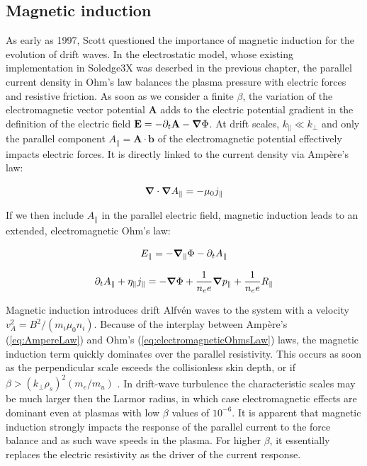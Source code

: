 \subsection{Magnetic induction}

As early as 1997, Scott\cite{scott1997} questioned the importance of magnetic induction for the evolution of drift waves. In the electrostatic model, whose existing implementation in Soledge3X was descrbed in the previous chapter, the parallel current density in Ohm's law balances the plasma pressure with electric forces and resistive friction. As soon as we consider a finite $\beta$, the variation of the electromagnetic vector potential $\mathbf{A}$ adds to the electric potential gradient in the definition of the electric field $ \mathbf{E} = -\partial_t \mathbf{A} - \grad \Phi$. At drift scales, $k_\parallel \ll k_\perp$ and only the parallel component $A_\parallel = \mathbf{A}\cdot\mathbf{b}$ of the electromagnetic potential effectively impacts electric forces. It is directly linked to the current density via Ampère's law: 

\begin{equation}
	\label{eq:edge_AmpereLaw}
	\grad\cdot\grad A_\parallel = -\mu_0 j_\parallel
\end{equation}

If we then include $A_\parallel$ in the parallel electric field, magnetic induction leads to an extended, electromagnetic Ohm's law:

\begin{equation}
	\label{eq:edge_EparaElectromagnetic}
	E_\parallel = -\grad_\parallel \Phi - \partial_tA_\parallel
\end{equation}


\begin{equation}
	\label{eq:edge_electromagneticOhmsLaw}
	\partial_t A_\parallel + \eta_\parallel j_\parallel = -\grad\Phi + \frac{1}{n_ee}\grad p_\parallel + \frac{1}{n_ee}R_\parallel
\end{equation}

Magnetic induction introduces drift Alfvén waves to the system with a velocity $v_A^2 = B^2/(m_i \mu_0 n_i)$. Because of the interplay between Ampère's (\ref{eq:AmpereLaw}) and Ohm's (\ref{eq:electromagneticOhmsLaw}) laws, the magnetic induction term quickly dominates over the parallel resistivity. This occurs as soon as the perpendicular scale esceeds the collisionless skin depth, or if $\beta > \left(k_\perp\rho_s\right)^2(m_e/m_u)$ \cite{mikhailovskii1963stability}. In drift-wave turbulence the characteristic scales may be much larger then the Larmor radius, in which case electromagnetic effects are dominant even at plasmas with low $\beta$ values of $10^{-6}$\cite{scott1997}. It is apparent that magnetic induction strongly impacts the response of the parallel current to the force balance and as such wave speeds in the plasma. For higher $\beta$, it essentially replaces the electric resistivity as the driver of the current response. \\ 


